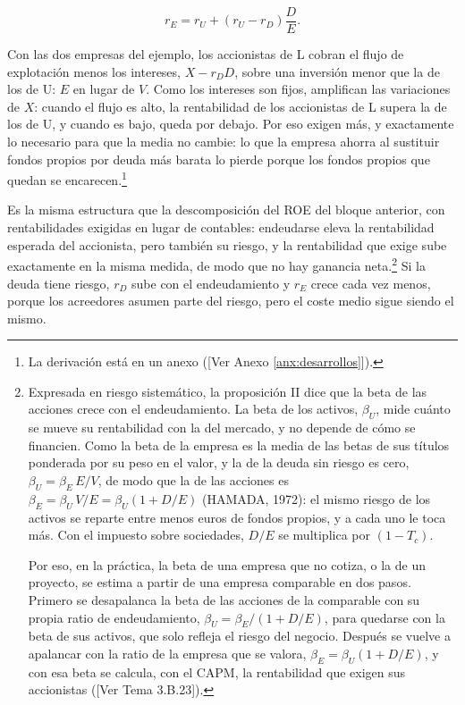 \documentclass[10pt,a4paper]{article}
\newcommand{\authorfont}[1]{{\fontfamily{EBGaramond-TLF}\selectfont #1}}
\newcounter{anexo}
\begin{document}
$$r_E=r_U+\left(r_U-r_D\right)\frac{D}{E}.$$

Con las dos empresas del ejemplo, los accionistas de L cobran el flujo de explotación menos los intereses, $X-r_DD$, sobre una inversión menor que la de los de U: $E$ en lugar de $V$. Como los intereses son fijos, amplifican las variaciones de $X$: cuando el flujo es alto, la rentabilidad de los accionistas de L supera la de los de U, y cuando es bajo, queda por debajo. Por eso exigen más, y exactamente lo necesario para que la media no cambie: lo que la empresa ahorra al sustituir fondos propios por deuda más barata lo pierde porque los fondos propios que quedan se encarecen.\footnote{%
    La derivación está en un anexo ([\authorfont{Ver Anexo \ref{anx:desarrollos}}]).
}

Es la misma estructura que la descomposición del ROE del bloque anterior, con rentabilidades exigidas en lugar de contables: endeudarse eleva la rentabilidad esperada del accionista, pero también su riesgo, y la rentabilidad que exige sube exactamente en la misma medida, de modo que no hay ganancia neta.\footnote{%
    Expresada en riesgo sistemático, la proposición II dice que la beta de las acciones crece con el endeudamiento. La beta de los activos, $\beta_U$, mide cuánto se mueve su rentabilidad con la del mercado, y no depende de cómo se financien. Como la beta de la empresa es la media de las betas de sus títulos ponderada por su peso en el valor, y la de la deuda sin riesgo es cero, $\beta_U=\beta_E\,E/V$, de modo que la de las acciones es $\beta_E=\beta_U\,V/E=\beta_U\left(1+D/E\right)$ (HAMADA, 1972): el mismo riesgo de los activos se reparte entre menos euros de fondos propios, y a cada uno le toca más. Con el impuesto sobre sociedades, $D/E$ se multiplica por $(1-T_c)$.

    Por eso, en la práctica, la beta de una empresa que no cotiza, o la de un proyecto, se estima a partir de una empresa comparable en dos pasos. Primero se desapalanca la beta de las acciones de la comparable con su propia ratio de endeudamiento, $\beta_U=\beta_E/(1+D/E)$, para quedarse con la beta de sus activos, que solo refleja el riesgo del negocio. Después se vuelve a apalancar con la ratio de la empresa que se valora, $\beta_E=\beta_U(1+D/E)$, y con esa beta se calcula, con el CAPM, la rentabilidad que exigen sus accionistas ([\authorfont{Ver Tema 3.B.23}]).
} Si la deuda tiene riesgo, $r_D$ sube con el endeudamiento y $r_E$ crece cada vez menos, porque los acreedores asumen parte del riesgo, pero el coste medio sigue siendo el mismo.
\end{document}
